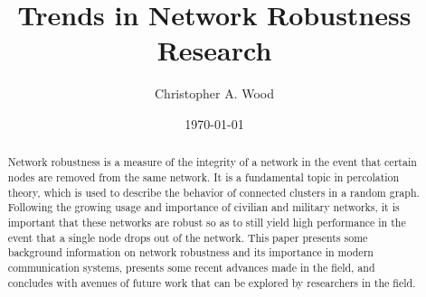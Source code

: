 \documentclass[10pt,a4paper,onecolumn]{article}
\author{Christopher A. Wood}
\title{Trends in Network Robustness Research}
\date{\today}
\begin{document}
\maketitle

\begin{abstract}
Network robustness is a measure of the integrity of a network in the event that
certain nodes are removed from the same network. It is a fundamental topic in
percolation theory, which is used to describe the behavior of connected clusters
in a random graph. Following the growing usage and importance of civilian and 
military networks, it is important that these networks are robust so as to still 
yield high performance in the event that a single node drops out of the network.
This paper presents some background information on network robustness and
its importance in modern communication systems, presents some recent advances
made in the field, and concludes with avenues of future work that can be explored
by researchers in the field. 
\end{abstract}
\end{document}
